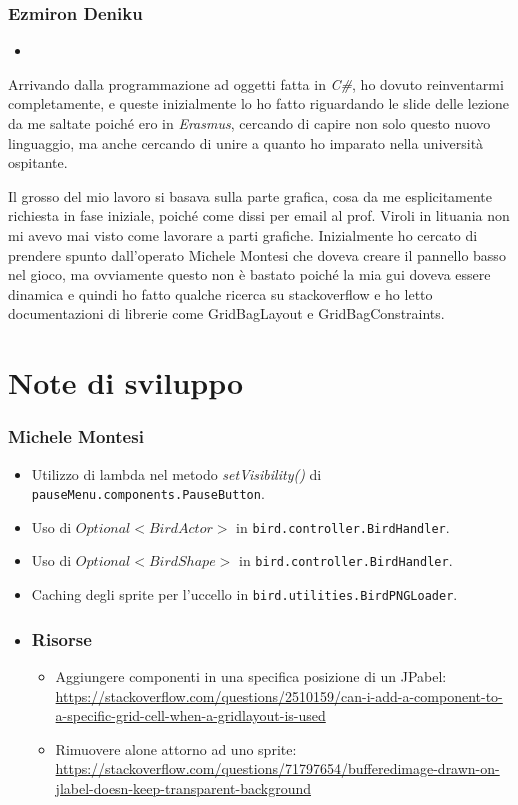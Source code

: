 \documentclass[a4paper,12pt]{report}
\begin{document}
\subsubsection{Ezmiron Deniku}

\begin{itemize}
    \item 
\end{itemize}

Arrivando dalla programmazione ad oggetti fatta in \emph{C#}, ho dovuto reinventarmi completamente, e queste inizialmente lo ho fatto riguardando le slide delle lezione da me saltate poiché ero in \emph{Erasmus}, cercando di capire non solo questo nuovo linguaggio, ma anche cercando di unire a quanto ho imparato nella università ospitante. 

Il grosso del mio lavoro si basava sulla parte grafica, cosa da me esplicitamente richiesta in fase iniziale, poiché come dissi per email al prof. Viroli in lituania non mi avevo mai visto come lavorare a parti grafiche. Inizialmente ho cercato di prendere spunto dall’operato Michele Montesi che doveva creare il pannello basso nel gioco, ma ovviamente questo non è bastato poiché la mia gui doveva essere dinamica e quindi ho fatto qualche ricerca su stackoverflow e ho letto documentazioni di librerie come GridBagLayout e GridBagConstraints.

\section{Note di sviluppo}
\subsubsection{Michele Montesi}

\begin{itemize}
    \item Utilizzo di lambda nel metodo \emph{setVisibility()} di \texttt{pauseMenu.components.PauseButton}.
    \item Uso di \emph{\(Optional<BirdActor>\)} in \texttt{bird.controller.BirdHandler}.
    \item Uso di \emph{\(Optional<BirdShape>\)} in \texttt{bird.controller.BirdHandler}.
    \item Caching degli sprite per l’uccello in \texttt{bird.utilities.BirdPNGLoader}.
    \item \subsubsection{Risorse}
    \begin{itemize}
        \item Aggiungere componenti in una specifica posizione di un JPabel:
        \url{https://stackoverflow.com/questions/2510159/can-i-add-a-component-to-a-specific-grid-cell-when-a-gridlayout-is-used}
        \item Rimuovere alone attorno ad uno sprite: \url{https://stackoverflow.com/questions/71797654/bufferedimage-drawn-on-jlabel-doesn-keep-transparent-background}
    \end{itemize}
\end{itemize}
\end{document}
